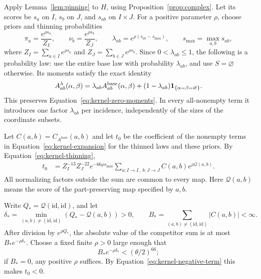 Apply Lemma~\ref{lem:pinning} to $H$, using
Proposition~\ref{prop:complex}. Let its scores be $s_a$ on $I$, $s_b$
on $J$, and $s_{ab}$ on $I\times J$. For a positive parameter $\rho$,
choose priors and thinning probabilities
\begin{equation}
 \pi_a=\frac{e^{\rho s_a}}{Z_I},\qquad
 \nu_b=\frac{e^{\rho s_b}}{Z_J},\qquad
 \lambda_{ab}=e^{\rho(s_{ab}-s_{\max})},\qquad
 s_{\max}=\max_{a,b}s_{ab},
 \label{eq:kernel-priors}
\end{equation}
where $Z_I=\sum_{a\in I}e^{\rho s_a}$ and
$Z_J=\sum_{b\in J}e^{\rho s_b}$. Since $0<\lambda_{ab}\le1$, the
following is a probability law: use the entire base law with
probability $\lambda_{ab}$, and use $S=\varnothing$ otherwise.
Its moments satisfy the exact identity
\begin{equation}
 A^\lambda_{ab}(\alpha,\beta)
 =\lambda_{ab}A^{\mathrm{base}}_{ab}(\alpha,\beta)
 +(1-\lambda_{ab})\mathbf 1_{\{\alpha=\beta=\varnothing\}}.
 \label{eq:kernel-thinning}
\end{equation}
This preserves Equation~\eqref{eq:kernel-zero-moments}. In every
all-nonempty term it introduces one factor $\lambda_{ab}$ per
incidence, independently of the sizes of the coordinate subsets.

Let $C(a,b)=C_{A^{\mathrm{base}}}(a,b)$ and let $t_0$ be the
coefficient of the nonempty terms in
Equation~\eqref{eq:kernel-expansion} for the thinned laws and these
priors. By Equation~\eqref{eq:kernel-thinning},
\begin{align}
 t_0
 &=Z_I^{-13}Z_J^{-22}e^{-66\rho s_{\max}}
     \sum_{a:I\to I\,,\ b:J\to J}
           C(a,b)e^{\rho\mathcal Q(a,b)}.
 \label{eq:kernel-pinned-coefficient}
\end{align}
All normalizing factors outside the sum are common to every map.
Here $\mathcal Q(a,b)$ means the score of the part-preserving map
specified by $a,b$.

Write $Q_*=\mathcal Q(\mathrm{id},\mathrm{id})$, and let
\[
 \delta_*=\min_{(a,b)\ne(\mathrm{id},\mathrm{id})}
          (Q_*-\mathcal Q(a,b))>0,
 \qquad
 B_*=\sum_{(a,b)\ne(\mathrm{id},\mathrm{id})}|C(a,b)|<\infty.
\]
After division by $e^{\rho Q_*}$, the absolute value of the
competitor sum is at most $B_*e^{-\rho\delta_*}$. Choose a fixed
finite $\rho>0$ large enough that
\begin{equation}
 B_*e^{-\rho\delta_*}<(\theta/2)^{66};
 \label{eq:kernel-finite-gap}
\end{equation}
if $B_*=0$, any positive $\rho$ suffices. By
Equation~\eqref{eq:kernel-negative-term} this makes $t_0<0$.

